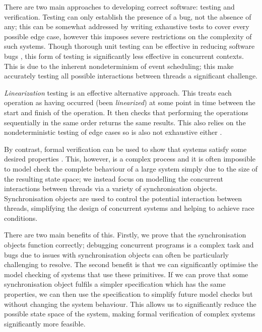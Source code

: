 There are two main approaches to developing correct software: testing and verification. 
Testing can only establish the presence of a bug, not the absence of any; this can be somewhat addressed by writing exhaustive tests to cover every possible edge case, however this imposes severe restrictions on the complexity of such systems. Though thorough unit testing can be effective in reducing software bugs \cite{MicroTest}, this form of testing is significantly less effective in concurrent contexts. This is due to the inherent nondeterminism of event scheduling; this make accurately testing all possible interactions between threads a significant challenge.

\emph{Linearization} testing is an effective alternative approach.
This treats each operation as having occurred (been \emph{linearized}) at some point in time between the start and finish of the operation. It then checks that performing the operations sequentially in the same order returns the same results.
This also relies on the nondeterministic testing of edge cases so is also not exhaustive either \cite{LoweLin}. %

By contrast, formal verification can be used to show that systems satisfy some desired properties \cite{PrinciplesOfModelChecking}. This, however, is a complex process and it is often impossible to model check the complete behaviour of a large system simply due to the size of the resulting state space; we instead focus on modelling the concurrent interactions between threads via a variety of synchronisation objects. Synchronisation objects are used to control the potential interaction between threads, simplifying the design of concurrent systems and helping to achieve race conditions.

There are two main benefits of this. Firstly, we prove that the synchronisation objects function correctly; debugging concurrent programs is a complex task and bugs due to issues with synchronisation objects can often be particularly challenging to resolve. The second benefit is that we can significantly optimise the model checking of systems that use these primitives. 
If we can prove that some synchronisation object fulfils a simpler specification which has the same properties, we can then use the specification to simplify future model checks but without changing the system behaviour. This allows us to significantly reduce the possible state space of the system, making formal verification of complex systems significantly more feasible.%

